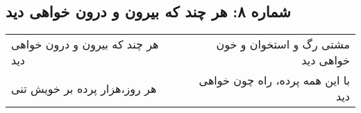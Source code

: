 \begin{center}
\section*{شماره ۸: هر چند که بیرون و درون خواهی دید}
\label{sec:008}
\begin{longtable}{l p{0.5cm} r}
هر چند که بیرون و درون خواهی دید
&&
مشتی رگ و استخوان و خون خواهی دید
\\
هر روز،‌هزار پرده بر خویش تنی
&&
با این همه پرده، راه چون خواهی دید
\\
\end{longtable}
\end{center}
